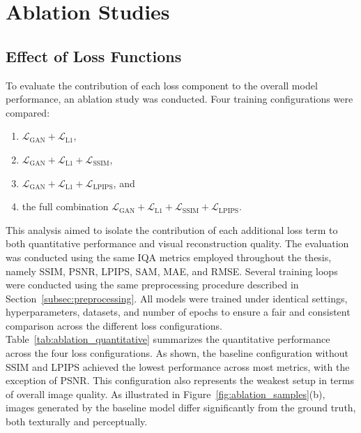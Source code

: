 \chapter{Ablation Studies}
\label{chapter:ablation}
\section{Effect of Loss Functions}
\label{subsec:ablation_loss}

To evaluate the contribution of each loss component to the overall model performance, an ablation study was conducted. Four training configurations were compared:
\begin{enumerate}
    \item $\mathcal{L}_{\text{GAN}} + \mathcal{L}_{\text{L1}}$,
    \item $\mathcal{L}_{\text{GAN}} + \mathcal{L}_{\text{L1}} + \mathcal{L}_{\text{SSIM}}$,
    \item $\mathcal{L}_{\text{GAN}} + \mathcal{L}_{\text{L1}} + \mathcal{L}_{\text{LPIPS}}$, and
    \item the full combination $\mathcal{L}_{\text{GAN}} + \mathcal{L}_{\text{L1}} + \mathcal{L}_{\text{SSIM}} + \mathcal{L}_{\text{LPIPS}}$.
\end{enumerate}
This analysis aimed to isolate the contribution of each additional loss term to both quantitative performance and visual reconstruction quality. The evaluation was conducted using the same IQA metrics employed throughout the thesis, namely SSIM, PSNR, LPIPS, SAM, MAE, and RMSE. Several training loops were conducted using the same preprocessing procedure described in Section~\ref{subsec:preprocessing}. All models were trained under identical settings, hyperparameters, datasets, and number of epochs to ensure a fair and consistent comparison across the different loss configurations.
Table~\ref{tab:ablation_quantitative} summarizes the quantitative performance across the four loss configurations. As shown, the baseline configuration without SSIM and LPIPS achieved the lowest performance across most metrics, with the exception of PSNR. This configuration also represents the weakest setup in terms of overall image quality. As illustrated in Figure~\ref{fig:ablation_samples}(b), images generated by the baseline model differ significantly from the ground truth, both texturally and perceptually. 

